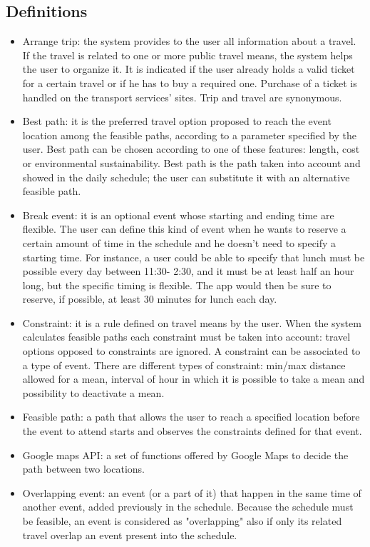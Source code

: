 \subsection{Definitions}
	\begin{itemize}
	\item Arrange trip: the system provides to the user all information about a travel. If the travel is related to one or more public travel means, the system helps the user to organize it. It is indicated if the user already holds a valid ticket for a certain travel or if he has to buy a required one. Purchase of a ticket is handled on the transport services' sites. Trip and travel are synonymous.
	\item Best path: it is the preferred travel option proposed to reach the event location among the feasible paths, according to a parameter specified by the user. Best path can be chosen according to one of these features: length, cost or environmental sustainability. Best path is the path taken into account and showed in the daily schedule; the user can substitute it with an alternative feasible path. 
	\item Break event: it is an optional event whose starting and ending time are flexible. The user can define this kind of event when he wants to reserve a certain amount of time in the schedule and he doesn't need to specify a starting time. For instance, a user could be able to specify that lunch must be possible every day between 11:30-
2:30, and it must be at least half an hour long, but the specific timing is flexible. The app would then be sure to reserve, if possible, at least 30 minutes for lunch each day.
	\item Constraint: it is a rule defined on travel means by the user. When the system calculates feasible paths each constraint must be taken into account: travel options opposed to constraints are ignored. A constraint can be associated to a type of event. There are different types of constraint: min/max distance allowed for a mean, interval of hour in which it is possible to take a mean and possibility to deactivate a mean. 
	\item Feasible path: a path that allows the user to reach a specified location before the event to attend starts and observes the constraints defined for that event.  
	\item Google maps API: a set of functions offered by Google Maps to decide  the path between two locations.
	\item Overlapping event: an event (or a part of it) that happen in the same time of another event, added previously in the schedule. Because the schedule must be feasible, an event is considered as "overlapping" also if only its related travel overlap an event present into the schedule.

\end{itemize}
